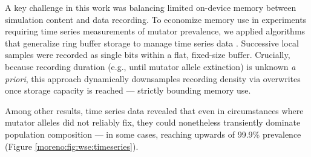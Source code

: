 A key challenge in this work was balancing limited on-device memory between simulation content and data recording.
To economize memory use in experiments requiring time series measurements of mutator prevalence, we applied algorithms that generalize ring buffer storage to manage time series data \cite{moreno2024algorithms,gunther2014algorithm}.
Successive local samples were recorded as single bits within a flat, fixed-size buffer.
Crucially, because recording duration (e.g., until mutator allele extinction) is unknown \textit{a priori}, this approach dynamically downsamples recording density via overwrites once storage capacity is reached --- strictly bounding memory use.

Among other results, time series data revealed that even in circumstances where mutator alleles did not reliably fix, they could nonetheless transiently dominate population composition --- in some cases, reaching upwards of 99.9\% prevalence (Figure \ref{moreno:fig:wse:timeseries}).



